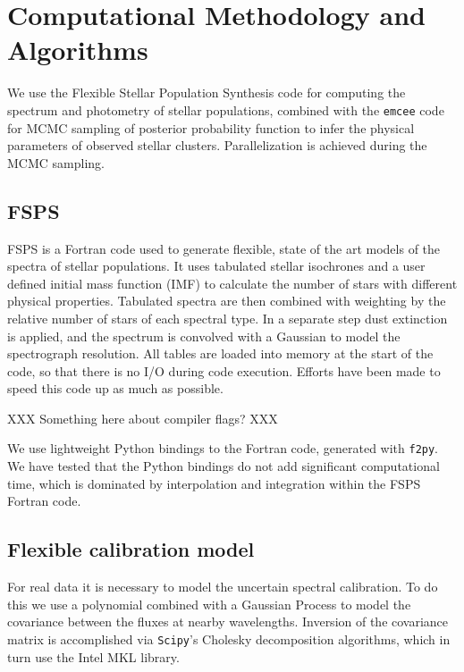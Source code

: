 \documentclass{article}
\begin{document}
\section{ Computational Methodology and Algorithms}
We use the Flexible Stellar Population Synthesis \citep[FSPS][]{fsps} code for computing the spectrum and photometry of stellar populations, combined with the \texttt{emcee} code for MCMC sampling of posterior probability function to infer the physical parameters of observed stellar clusters.  Parallelization is achieved during the MCMC sampling.

\subsection{FSPS}
FSPS is a Fortran code used to generate flexible, state of the art models of the spectra of stellar populations.  It uses tabulated stellar isochrones and a user defined initial mass function (IMF) to calculate the number of stars with different physical properties.  Tabulated spectra are then combined with weighting by the relative number of stars of each spectral type.  In a separate step dust extinction is applied, and the spectrum is convolved with a Gaussian to model the spectrograph resolution.  All tables are loaded into memory at the start of the code, so that there is no I/O during code execution.  Efforts have been made to speed this code up as much as possible.

XXX Something here about compiler flags? XXX

We use lightweight Python bindings to the Fortran code, generated with \texttt{f2py}.  We have tested that the Python bindings do not add significant computational time, which is dominated by interpolation and integration within the FSPS Fortran code.

\subsection{Flexible calibration model}
For real data it is necessary to model the uncertain spectral calibration.  To do this we use a polynomial combined with a Gaussian Process \citep[e.g.,][]{RW} to model the covariance between the fluxes at nearby wavelengths.  Inversion of the covariance matrix is accomplished via \texttt{Scipy}'s Cholesky decomposition algorithms, which in turn use the Intel MKL library.
\end{document}
